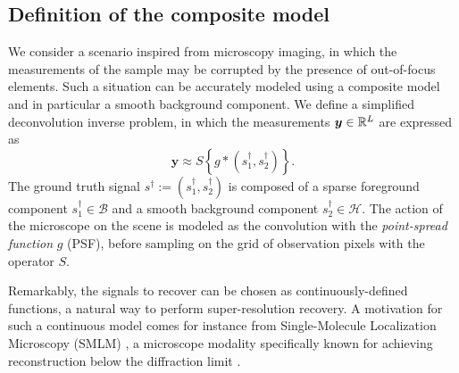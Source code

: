 \documentclass[12pt]{article}
\begin{document}
    \subsection{Definition of the composite model}
    \label{sec:comp:model}
        


        We consider a scenario inspired from microscopy imaging, in which the measurements of the sample may be corrupted by the presence of out-of-focus elements. Such a situation can be accurately modeled using a composite model and in particular a smooth background component.
        We define a simplified deconvolution inverse problem, in which the measurements $\bm{y}\in\mathbb{R}^L$ are expressed as
        \begin{equation*}
            \bm{y} \approx S \left\{g * (s_1^\dagger, s_2^\dagger)\right\}.
        \end{equation*}
        The ground truth signal $s^\dagger := (s_1^\dagger, s_2^\dagger)$ is composed of a sparse foreground component $s_1^\dagger \in \mathcal{B}$ and a smooth background component $s_2^\dagger \in \mathcal{H}$. The action of the microscope on the scene is modeled as the convolution with the \emph{point-spread function} $g$ (PSF), before sampling on the grid of observation pixels with the operator $S$.

        Remarkably, the signals to recover can be chosen as continuously-defined functions, a natural way to perform super-resolution recovery. A motivation for such a continuous model comes for instance from Single-Molecule Localization Microscopy (SMLM) \cite{sage2019smlm}, a microscope modality specifically known for achieving reconstruction below the diffraction limit \cite{huang2017super,denoyelle2019sliding,laville2021sparse}.
\end{document}
